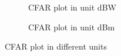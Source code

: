 \documentclass[12pt,DIV14,BCOR12mm,a4paper,footinclude=false,headinclude,parskip=half-,twoside,openright,cleardoublepage=empty,toc=index,bibliography=totoc,listof=totoc]{scrreprt}
\numberwithin{equation}{chapter}
\begin{document}
\begin{figure}[t]
    \begin{subfigure}{0.45\textwidth}
        \centering
        \caption{CFAR plot in unit dBW}
        \label{1c_empty_dBW}
    \end{subfigure}\hspace{0.5cm}
    \begin{subfigure}{0.45\textwidth}
        \centering
        \caption{CFAR plot in unit dBm}
        \label{1c_empty_dBm}
    \end{subfigure}
    \caption{CFAR plot in different units}
    \label{cfar plot in different units}
\end{figure}
\end{document}
